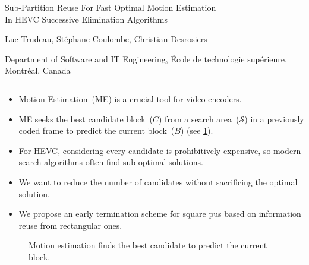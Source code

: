 \documentclass[10pt, sans, mathserif]{beamer}
\begin{document}
\begin{frame}[t]
    \centering


    \huge{Sub-Partition Reuse For Fast Optimal Motion Estimation\\ In HEVC Successive Elimination Algorithms}

    \LARGE{Luc Trudeau, Stéphane Coulombe, Christian Desrosiers}

    \Large{Department of Software and IT Engineering, École de technologie supérieure, Montréal, Canada}

    \normalsize

 \begin{columns}[t, onlytextwidth]
    \begin{column}{0.5\textwidth}
        \begin{block}{}
            \begin{itemize}
            \item Motion Estimation~(ME) is a crucial tool for video encoders.
            \item ME seeks the best candidate block~($C$) from a search area~($\mathcal{S}$) in a previously coded frame to predict the current block~($B$) (see \cref{fig:MotionEstimation}).
            \item For HEVC, considering every candidate is prohibitively expensive, so modern search algorithms often find sub-optimal solutions.
            \item We want to reduce the number of candidates without sacrificing the optimal solution.
            \item We propose an early termination scheme for square \glspl{pu} based on information reuse from rectangular ones.
            \end{itemize}
            \begin{figure}[H]
                \vspace{-2em}
                \centering
                
                \vspace{-1em}
                \caption{Motion estimation finds the best candidate to predict the current block.}
                \label{fig:MotionEstimation}
            \end{figure}


\end{block}
\end{column}
\end{columns}
\end{frame}
\end{document}
